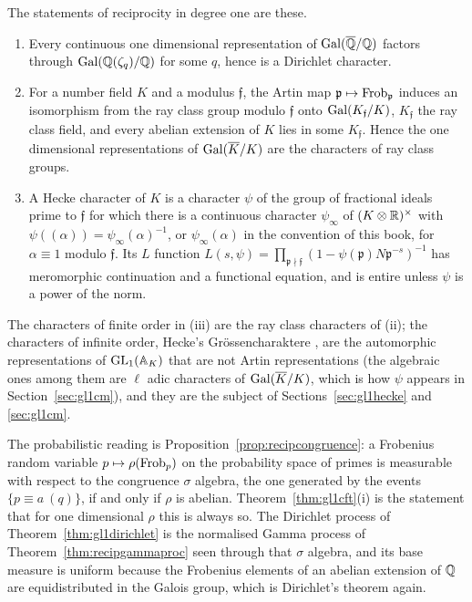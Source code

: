 The statements of reciprocity in degree one are these.

\begin{theorem}\label{thm:gl1cft}
\begin{enumerate}
\item[(i)] Every continuous one dimensional representation of $\operatorname{Gal}(\overline{\mathbb{Q}}/\mathbb{Q})$ factors through $\operatorname{Gal}(\mathbb{Q}(\zeta_q)/\mathbb{Q})$ for some $q$, hence is a Dirichlet character.
\item[(ii)] For a number field $K$ and a modulus $\mathfrak f$, the Artin map $\mathfrak p\mapsto\operatorname{Frob}_{\mathfrak p}$ induces an isomorphism from the ray class group modulo $\mathfrak f$ onto $\operatorname{Gal}(K_{\mathfrak f}/K)$, $K_{\mathfrak f}$ the ray class field, and every abelian extension of $K$ lies in some $K_{\mathfrak f}$. Hence the one dimensional representations of $\operatorname{Gal}(\overline K/K)$ are the characters of ray class groups.
\item[(iii)] A Hecke character of $K$ is a character $\psi$ of the group of fractional ideals prime to $\mathfrak f$ for which there is a continuous character $\psi_\infty$ of $(K\otimes\mathbb{R})^\times$ with $\psi((\alpha))=\psi_\infty(\alpha)^{-1}$, or $\psi_\infty(\alpha)$ in the convention of this book, for $\alpha\equiv1$ modulo $\mathfrak f$. Its $L$ function $L(s,\psi)=\prod_{\mathfrak p\nmid\mathfrak f}(1-\psi(\mathfrak p)N\mathfrak p^{-s})^{-1}$ has meromorphic continuation and a functional equation, and is entire unless $\psi$ is a power of the norm.
\end{enumerate}
\end{theorem}

The characters of finite order in (iii) are the ray class characters of (ii); the characters of infinite order, Hecke's Gr\"ossencharaktere \cite{hecke1920}, are the automorphic representations of $\mathrm{GL}_1(\mathbb{A}_K)$ that are not Artin representations (the algebraic ones among them are $\ell$ adic characters of $\operatorname{Gal}(\overline K/K)$, which is how $\psi$ appears in Section~\ref{sec:gl1cm}), and they are the subject of Sections~\ref{sec:gl1hecke} and \ref{sec:gl1cm}.

The probabilistic reading is Proposition~\ref{prop:recipcongruence}: a Frobenius random variable $p\mapsto\rho(\operatorname{Frob}_p)$ on the probability space of primes is measurable with respect to the congruence $\sigma$ algebra, the one generated by the events $\{p\equiv a\ (q)\}$, if and only if $\rho$ is abelian. Theorem~\ref{thm:gl1cft}(i) is the statement that for one dimensional $\rho$ this is always so. The Dirichlet process of Theorem~\ref{thm:gl1dirichlet} is the normalised Gamma process of Theorem~\ref{thm:recipgammaproc} seen through that $\sigma$ algebra, and its base measure is uniform because the Frobenius elements of an abelian extension of $\mathbb{Q}$ are equidistributed in the Galois group, which is Dirichlet's theorem again.

